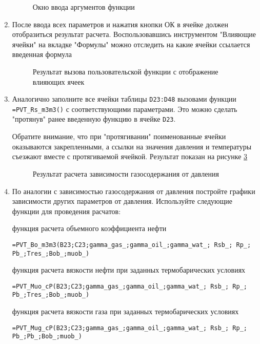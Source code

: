 \begin{enumerate}
	\begin{figure}[h!]
		\center{\texttt{[image: Ex10\_3]}}
		\caption{Окно ввода аргументов функции}
		\label{ris:Ex10_3}
	\end{figure}

	\item После ввода всех параметров и нажатия кнопки ОК в ячейке должен отобразиться результат расчета. Воспользовавшись инструментом "Влияющие ячейки" на вкладке "Формулы" можно отследить на какие ячейки ссылается введенная формула
	\begin{figure}[h!]
		\center{\texttt{[image: Ex10\_4]}}
		\caption{Результат вызова пользовательской функции с отображение влияющих ячеек}
		\label{ris:Ex10_4}
	\end{figure}

	\item Аналогично заполните все ячейки таблицы  \texttt{D23:D48} вызовами функции \texttt{=PVT\_Rs\_m3m3()} с соответствующими параметрами. Это можно сделать "протянув" ранее введенную функцию в ячейке \texttt{D23}.
	
	Обратите внимание, что при "протягивании" поименованные ячейки оказываются закрепленными, а ссылки на значения давления и температуры съезжают вместе с протягиваемой ячейкой. Результат показан на рисунке \ref{ris:Ex10_5}
	\begin{figure}[h!]
		\center{\texttt{[image: Ex10\_5]}}
		\caption{Результат расчета зависимости газосодержания от давления}
		\label{ris:Ex10_5}
	\end{figure}

	\item По аналогии с зависимостью газосодержания от давления постройте графики зависимости других параметров от давления. Используйте следующие функции для проведения расчатов: 
	
	функция расчета объемного коэффициента нефти
	
	{ \small  \texttt{=PVT\_Bo\_m3m3(B23;C23;gamma\_gas\_;gamma\_oil\_;gamma\_wat\_; Rsb\_; Rp\_; Pb\_;Tres\_;Bob\_;muob\_)}}
	
	функция расчета вязкости нефти при заданных термобарических условиях
	
	{ \small  \texttt{=PVT\_Muo\_cP(B23;C23;gamma\_gas\_;gamma\_oil\_;gamma\_wat\_; Rsb\_; Rp\_; Pb\_;Tres\_;Bob\_;muob\_)}}
	
    функция расчета вязкости газа при заданных термобарических условиях
	
	{ \small  \texttt{=PVT\_Mug\_cP(B23;C23;gamma\_gas\_;gamma\_oil\_;gamma\_wat\_; Rsb\_; Rp\_; Pb\_;Pb\_;Bob\_;muob\_)}}
	

\end{enumerate}
